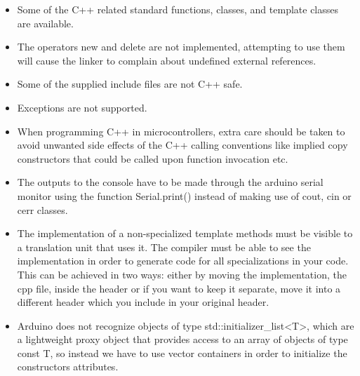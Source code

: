 \begin{refsection}
	    \begin{itemize}
	    	\item Some of the C++ related standard functions, classes, and template classes are available.
	    	\item The operators new and delete are not implemented, attempting to use them will cause the linker to complain about undefined external references.
	    	\item Some of the supplied include files are not C++ safe.
	    	\item Exceptions are not supported.
	    	\item When programming C++ in microcontrollers, extra care should be taken to avoid unwanted side effects of the C++ calling conventions like implied copy constructors that could be called upon function invocation etc.
	    	\item The outputs to the console have to be made through the arduino serial monitor using the function Serial.print() instead of making use of cout, cin or cerr classes.
	    	\item  The implementation of a non-specialized template methods must be visible to a translation unit that uses it. The compiler must be able to see the implementation in order to generate code for all specializations in your code. This can be achieved in two ways: either by moving the implementation, the cpp file, inside the header or if you want to keep it separate, move it into a different header which you include in your original header.
	    	\item Arduino does not recognize objects of type std::initializer\_list<T>, which are a lightweight proxy object that provides access to an array of objects of type const T, so instead we have to use vector containers in order to initialize the constructors attributes.
	\end{itemize}

\end{refsection}
